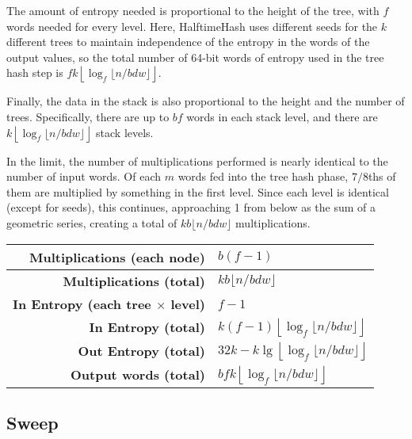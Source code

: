\documentclass[sigconf, nonacm]{acmart}
\begin{document}

The amount of entropy needed is proportional to the height of the tree, with $f$ words needed for every level.
Here, HalftimeHash uses different seeds for the $k$ different trees to maintain independence of the entropy in the words of the output values, so the total number of 64-bit words of entropy used in the tree hash step is $f k\left\lfloor\log_f \lfloor n/b d w\rfloor\right\rfloor$.

Finally, the data in the stack is also proportional to the height and the number of trees.
Specifically, there are up to $b f$ words in each stack level, and there are $k \left\lfloor \log_f \lfloor n / b d w \rfloor \right\rfloor$ stack levels.

In the limit, the number of multiplications performed is nearly identical to the number of input words.
Of each $m$ words fed into the tree hash phase, $7/8$ths of them are multiplied by something in the first level.
Since each level is identical (except for seeds), this continues, approaching 1 from below as the sum of a geometric series, creating a total of $k b \lfloor n / b d w \rfloor$ multiplications.

\begin{tabular}{|r|l|}
    \hline {\bf Multiplications (each node)} & $b (f-1)$ \\
    \hline {\bf Multiplications (total)} & $k b \lfloor n / b d w \rfloor$ \\
    \hline {\bf In Entropy (each tree $\times$ level)} & $f-1$ \\
    \hline {\bf In Entropy (total)} & $k (f-1) \left\lfloor \log_f \lfloor n / b d w \rfloor \right\rfloor$ \\
    \hline {\bf Out Entropy (total)} & $32k - k\lg\left\lfloor\log_f \lfloor n/b d w\rfloor\right\rfloor$\\
    \hline {\bf Output words (total)} & $b f k \left\lfloor \log_f \lfloor n / b d w \rfloor \right\rfloor$\\
    \hline
\end{tabular}


\subsection{Sweep}
\end{document}
